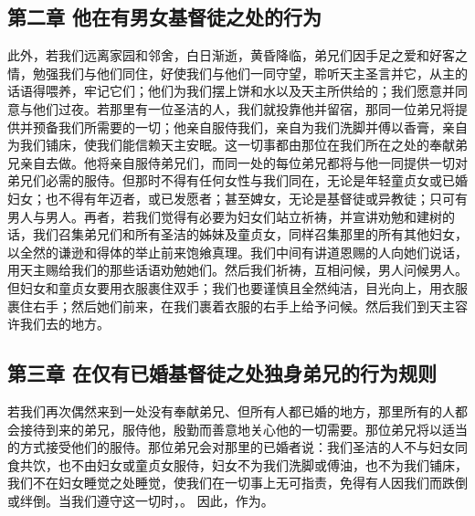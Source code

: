 
\subsection{第二章 他在有男女基督徒之处的行为}

此外，若我们远离家园和邻舍，白日渐逝，黄昏降临，弟兄们因手足之爱和好客之情，勉强我们与他们同住，好使我们与他们一同守望，聆听天主圣言并它，从主的话语得喂养，牢记它们；他们为我们摆上饼和水以及天主所供给的；我们愿意并同意与他们过夜。若那里有一位圣洁的人，我们就投靠他并留宿，那同一位弟兄将提供并预备我们所需要的一切；他亲自服侍我们，亲自为我们洗脚并傅以香膏，亲自为我们铺床，使我们能信赖天主安眠。这一切事都由那位在我们所在之处的奉献弟兄亲自去做。他将亲自服侍弟兄们，而同一处的每位弟兄都将与他一同提供一切对弟兄们必需的服侍。但那时不得有任何女性与我们同在，无论是年轻童贞女或已婚妇女；也不得有年迈者，或已发愿者；甚至婢女，无论是基督徒或异教徒；只可有男人与男人。再者，若我们觉得有必要为妇女们站立祈祷，并宣讲劝勉和建树的话，我们召集弟兄们和所有圣洁的姊妹及童贞女，同样召集那里的所有其他妇女，以全然的谦逊和得体的举止前来饱飨真理。我们中间有讲道恩赐的人向她们说话，用天主赐给我们的那些话语劝勉她们。然后我们祈祷，互相问候，男人问候男人。但妇女和童贞女要用衣服裹住双手；我们也要谨慎且全然纯洁，目光向上，用衣服裹住右手；然后她们前来，在我们裹着衣服的右手上给予问候。然后我们到天主容许我们去的地方。\par


\subsection{第三章 在仅有已婚基督徒之处独身弟兄的行为规则}

若我们再次偶然来到一处没有奉献弟兄、但所有人都已婚的地方，那里所有的人都会接待到来的弟兄，服侍他，殷勤而善意地关心他的一切需要。那位弟兄将以适当的方式接受他们的服侍。那位弟兄会对那里的已婚者说：我们圣洁的人不与妇女同食共饮，也不由妇女或童贞女服侍，妇女不为我们洗脚或傅油，也不为我们铺床，我们不在妇女睡觉之处睡觉，使我们在一切事上无可指责，免得有人因我们而跌倒或绊倒。当我们遵守这一切时，。 因此，作为。\par


